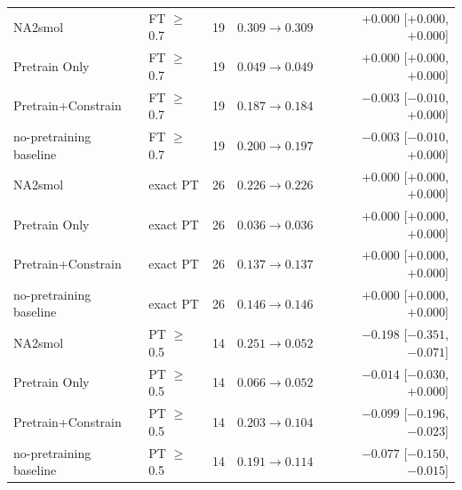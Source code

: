 \begin{tabular}{@{}llrrr@{}}
NA2smol & FT $\geq$0.7 & 19 & $0.309\to 0.309$ & $+0.000$ [$+0.000$, $+0.000$] \\
Pretrain Only & FT $\geq$0.7 & 19 & $0.049\to 0.049$ & $+0.000$ [$+0.000$, $+0.000$] \\
Pretrain+Constrain & FT $\geq$0.7 & 19 & $0.187\to 0.184$ & $-0.003$ [$-0.010$, $+0.000$] \\
no-pretraining baseline & FT $\geq$0.7 & 19 & $0.200\to 0.197$ & $-0.003$ [$-0.010$, $+0.000$] \\
NA2smol & exact PT & 26 & $0.226\to 0.226$ & $+0.000$ [$+0.000$, $+0.000$] \\
Pretrain Only & exact PT & 26 & $0.036\to 0.036$ & $+0.000$ [$+0.000$, $+0.000$] \\
Pretrain+Constrain & exact PT & 26 & $0.137\to 0.137$ & $+0.000$ [$+0.000$, $+0.000$] \\
no-pretraining baseline & exact PT & 26 & $0.146\to 0.146$ & $+0.000$ [$+0.000$, $+0.000$] \\
NA2smol & PT $\geq$0.5 & 14 & $0.251\to 0.052$ & $-0.198$ [$-0.351$, $-0.071$] \\
Pretrain Only & PT $\geq$0.5 & 14 & $0.066\to 0.052$ & $-0.014$ [$-0.030$, $+0.000$] \\
Pretrain+Constrain & PT $\geq$0.5 & 14 & $0.203\to 0.104$ & $-0.099$ [$-0.196$, $-0.023$] \\
no-pretraining baseline & PT $\geq$0.5 & 14 & $0.191\to 0.114$ & $-0.077$ [$-0.150$, $-0.015$] \\
\bottomrule
\end{tabular}

